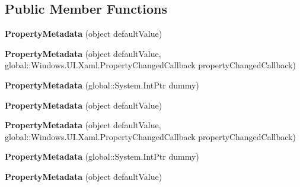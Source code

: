 \subsection*{Public Member Functions}
\begin{DoxyCompactItemize}
\item 
\mbox{\label{class_windows_1_1_u_i_1_1_xaml_1_1_property_metadata_a03c8e41f83ddfc0a939dc5eb79e9c582}} 
{\bfseries Property\+Metadata} (object default\+Value)
\item 
\mbox{\label{class_windows_1_1_u_i_1_1_xaml_1_1_property_metadata_a467484bb1dc0b4d652be926ba6a115f2}} 
{\bfseries Property\+Metadata} (object default\+Value, global\+::\+Windows.\+U\+I.\+Xaml.\+Property\+Changed\+Callback property\+Changed\+Callback)
\item 
\mbox{\label{class_windows_1_1_u_i_1_1_xaml_1_1_property_metadata_a4f2fac6d917c0b1af18cf98789158556}} 
{\bfseries Property\+Metadata} (global\+::\+System.\+Int\+Ptr dummy)
\item 
\mbox{\label{class_windows_1_1_u_i_1_1_xaml_1_1_property_metadata_a03c8e41f83ddfc0a939dc5eb79e9c582}} 
{\bfseries Property\+Metadata} (object default\+Value)
\item 
\mbox{\label{class_windows_1_1_u_i_1_1_xaml_1_1_property_metadata_a467484bb1dc0b4d652be926ba6a115f2}} 
{\bfseries Property\+Metadata} (object default\+Value, global\+::\+Windows.\+U\+I.\+Xaml.\+Property\+Changed\+Callback property\+Changed\+Callback)
\item 
\mbox{\label{class_windows_1_1_u_i_1_1_xaml_1_1_property_metadata_a4f2fac6d917c0b1af18cf98789158556}} 
{\bfseries Property\+Metadata} (global\+::\+System.\+Int\+Ptr dummy)
\item 
\mbox{\label{class_windows_1_1_u_i_1_1_xaml_1_1_property_metadata_a03c8e41f83ddfc0a939dc5eb79e9c582}} 
{\bfseries Property\+Metadata} (object default\+Value)

\end{DoxyCompactItemize}
